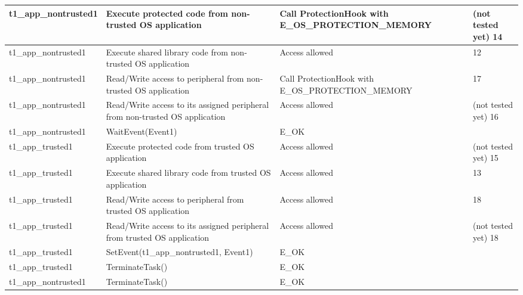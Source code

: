 \documentclass[10pt]{article}
\newlength{\Li}\settowidth{\Li}{Running}
\newlength{\Lii}\setlength{\Lii}{7cm}
\newlength{\Liiii}\setlength{\Liiii}{0.9cm}
\newlength{\Liii}\setlength{\Liii}{\textwidth} \addtolength{\Liii}{-\Li} \addtolength{\Liii}{-\Lii} \addtolength{\Liii}{-\Liiii}
\begin{document}
	\begin{supertabular}{|p{\Li}|p{\Lii}|p{\Liii}|p{\Liiii}|} \hline 
	t1\_app\_nontrusted1	& Execute protected code from non-trusted OS application		& Call ProtectionHook with E\_OS\_PROTECTION\_MEMORY		& (not tested yet) 14 \\ \hline
	t1\_app\_nontrusted1	& Execute shared library code from non-trusted OS application 	& Access allowed									& 12 \\ \hline
	t1\_app\_nontrusted1	& Read/Write access to peripheral from non-trusted OS application 	& Call ProtectionHook with E\_OS\_PROTECTION\_MEMORY		& 17 \\ \hline
	t1\_app\_nontrusted1	& Read/Write access to its assigned peripheral from non-trusted OS application	& Access allowed						& (not tested yet) 16 \\ \hline
	
	t1\_app\_nontrusted1	& WaitEvent(Event1)										& E\_OK											& \\ \hline
	
	t1\_app\_trusted1		& Execute protected code from trusted OS application			& Access allowed									& (not tested yet) 15 \\ \hline
	t1\_app\_trusted1		& Execute shared library code from trusted OS application 		& Access allowed									& 13 \\ \hline
	t1\_app\_trusted1		& Read/Write access to peripheral from trusted OS application 	& Access allowed									& 18 \\ \hline
	t1\_app\_trusted1		& Read/Write access to its assigned peripheral from trusted OS application	& Access allowed							& (not tested yet) 18 \\ \hline
	t1\_app\_trusted1		& SetEvent(t1\_app\_nontrusted1, Event1)					& E\_OK											& \\ \hline
	
	t1\_app\_trusted1		& TerminateTask()										& E\_OK											& \\ \hline
	t1\_app\_nontrusted1	& TerminateTask()										& E\_OK											& \\ \hline
	\end{supertabular}\\



\end{document}
